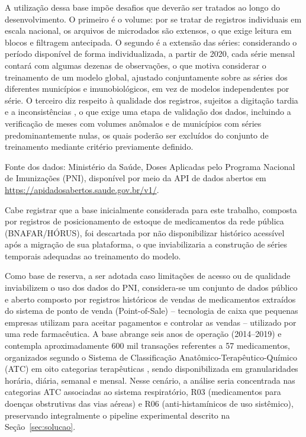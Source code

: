 \documentclass[
    12pt,                %
    openright,           %
    oneside,             %
    a4paper,             %
    english,             %
    brazil               %
]{abntex2}
\begin{document}
A utilização dessa base impõe desafios que deverão ser tratados ao longo do desenvolvimento. O primeiro é o volume: por se tratar de registros individuais em escala nacional, os arquivos de microdados são extensos, o que exige leitura em blocos e filtragem antecipada. O segundo é a extensão das séries: considerando o período disponível de forma individualizada, a partir de 2020, cada série mensal contará com algumas dezenas de observações, o que motiva considerar o treinamento de um modelo global, ajustado conjuntamente sobre as séries dos diferentes municípios e imunobiológicos, em vez de modelos independentes por série. O terceiro diz respeito à qualidade dos registros, sujeitos a digitação tardia e a inconsistências \cite{Lopes2022}, o que exige uma etapa de validação dos dados, incluindo a verificação de meses com volumes anômalos e de municípios com séries predominantemente nulas, os quais poderão ser excluídos do conjunto de treinamento mediante critério previamente definido.

Fonte dos dados: Ministério da Saúde, Doses Aplicadas pelo Programa Nacional de Imunizações (PNI), disponível por meio da API de dados abertos em \url{https://apidadosabertos.saude.gov.br/v1/}.

Cabe registrar que a base inicialmente considerada para este trabalho, composta por registros de posicionamento de estoque de medicamentos da rede pública (BNAFAR/HÓRUS), foi descartada por não disponibilizar histórico acessível após a migração de sua plataforma, o que inviabilizaria a construção de séries temporais adequadas ao treinamento do modelo.

Como base de reserva, a ser adotada caso limitações de acesso ou de qualidade inviabilizem o uso dos dados do PNI, considera-se um conjunto de dados público e aberto composto por registros históricos de vendas de medicamentos extraídos do sistema de ponto de venda (Point-of-Sale) -- tecnologia de caixa que pequenas empresas utilizam para aceitar pagamentos e controlar as vendas -- utilizado por uma rede farmacêutica. A base abrange seis anos de operação (2014--2019) e contempla aproximadamente 600 mil transações referentes a 57 medicamentos, organizados segundo o Sistema de Classificação Anatômico-Terapêutico-Químico (ATC) em oito categorias terapêuticas \cite{ATCDDD2026}, sendo disponibilizada em granularidades horária, diária, semanal e mensal. Nesse cenário, a análise seria concentrada nas categorias ATC associadas ao sistema respiratório, R03 (medicamentos para doenças obstrutivas das vias aéreas) e R06 (anti-histamínicos de uso sistêmico), preservando integralmente o pipeline experimental descrito na Seção~\ref{sec:solucao}.
\end{document}
